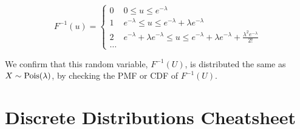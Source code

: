 \documentclass[11pt]{article}
\begin{document}
\begin{description}
 \begin{displaymath}
   F^{-1}(u) = \left\{
     \begin{array}{ll}
       0 & 0 \leq u \leq e^{-\lambda}\\
       1 & e^{-\lambda} \leq u \leq e^{-\lambda} + \lambda e^{-\lambda} \\
       2 & e^{-\lambda} + \lambda e^{-\lambda} \leq u \leq e^{-\lambda} +  \lambda e^{-\lambda} + \frac{\lambda^2 e^{-\lambda}}{2!}\\
       \dots & ~
     \end{array}
   \right.
\end{displaymath}

We confirm that this random variable, $F^{-1}(U)$, is distributed the same as $X \sim \textrm{Pois}(\lambda)$, by checking the PMF or CDF of $F^{-1}(U)$.

\end{description}

\pagebreak

\section*{Discrete Distributions Cheatsheet}
\end{document}
